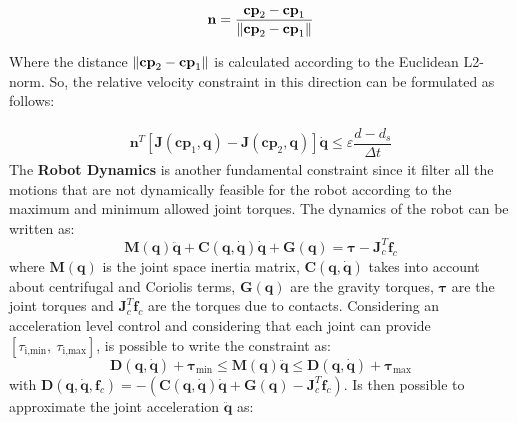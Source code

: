 \begin{equation} 
\label{eq:unit_vector}
\begin{array}{c}
\mathbf{n} = \dfrac{\mathbf{cp}_2-\mathbf{cp}_1}{\Arrowvert \mathbf{cp}_2-\mathbf{cp}_1 \Arrowvert} 
\end{array}
\end{equation}

Where the distance $ \Arrowvert \mathbf{cp}_2-\mathbf{cp}_1 \Arrowvert $ is calculated according to the Euclidean L2-norm. So, the relative velocity constraint in this direction can be formulated as follows:

\begin{equation} 
\label{eq:SCA_constraint}
\begin{array}{c}
\mathbf{n}^{T}[\mathbf{J}(\mathbf{cp}_1,\mathbf{q})-\mathbf{J}(\mathbf{cp}_2,\mathbf{q})]\dot{\mathbf{q}} \leq \varepsilon \dfrac{d-d_s}{\Delta t} 
\end{array}
\end{equation}
The \textbf{Robot Dynamics} is another fundamental constraint since it filter all the motions that are not dynamically feasible for the robot according to the maximum and minimum allowed joint torques. The dynamics of the robot can be written as:
\begin{equation}
\mathbf{M}(\mathbf{q})\mathbf{\ddot{q}} + \mathbf{C}(\mathbf{q},\mathbf{\dot{q}})\mathbf{\dot{q}} + \mathbf{G}(\mathbf{q}) = \boldsymbol{\tau} - \mathbf{J}^T_c\mathbf{f}_c
\end{equation}
where $\mathbf{M}(\mathbf{q})$ is the joint space inertia matrix, $\mathbf{C}(\mathbf{q},\mathbf{\dot{q}})$ takes into account about centrifugal and Coriolis terms, $\mathbf{G}(\mathbf{q})$ are the gravity torques, $\boldsymbol{\tau}$ are the joint torques and $\mathbf{J}^T_c\mathbf{f}_c$ are the torques due to contacts. Considering an acceleration level control and considering that each joint can provide $\left[\tau_{\text{i,min}}, \ \tau_{\text{i,max}} \right]$, is possible to write the constraint as:
\begin{equation}
\mathbf{D}(\mathbf{q, \dot{q}}) + \boldsymbol{\tau}_\text{min}\leq \mathbf{M}(\mathbf{q})\mathbf{\ddot{q}} \leq  \mathbf{D}(\mathbf{q, \dot{q}}) + \boldsymbol{\tau}_\text{max}
\end{equation}
with $\mathbf{D}(\mathbf{q, \dot{q}},\mathbf{f}_c) = -\left(\mathbf{C}(\mathbf{q},\mathbf{\dot{q}})\mathbf{\dot{q}} + \mathbf{G}(\mathbf{q}) - \mathbf{J}^T_c\mathbf{f}_c \right )$. Is then possible to approximate the joint acceleration $\mathbf{\ddot{q}}$ as:
